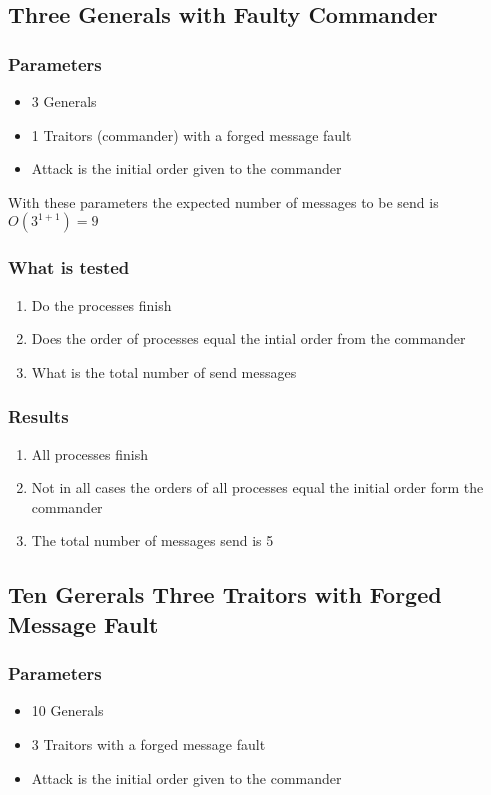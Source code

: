 \documentclass[a4paper, notitlepage]{article}
\begin{document}
\subsection{Three Generals with Faulty Commander}

\subsubsection*{Parameters}
\begin{itemize}
\item 3 Generals
\item 1 Traitors (commander) with a forged message fault
\item Attack is the initial order given to the commander
\end{itemize}

With these parameters the expected number of messages to be send is \(O(3^{1+1}) = 9\)

\subsubsection*{What is tested}
\begin{enumerate}
\item Do the processes finish
\item Does the order of processes equal the intial order from the commander
\item What is the total number of send messages
\end{enumerate}

\subsubsection*{Results}
\begin{enumerate}
\item All processes finish
\item Not in all cases the orders of all processes equal the initial order form the commander
\item The total number of messages send is 5
\end{enumerate}




\subsection{Ten Gererals Three Traitors with Forged Message Fault}

\subsubsection*{Parameters}
\begin{itemize}
\item 10 Generals
\item 3 Traitors with a forged message fault
\item Attack is the initial order given to the commander
\end{itemize}
\end{document}
